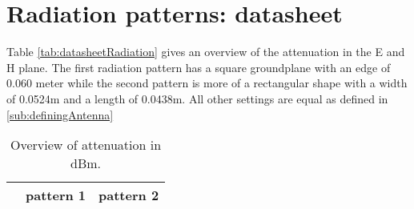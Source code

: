 \chapter{Radiation patterns: datasheet}
\label{ch:radpattern}
Table \ref{tab:datasheetRadiation} gives an overview of the attenuation in the E and H plane. The first radiation pattern 
 has a square groundplane with an edge of 0.060 meter while the second pattern is more of a rectangular shape with a width of 0.0524m and a length of 0.0438m.
All other settings are equal as defined in \ref{sub:definingAntenna}
\begin{table*}[!ht]
\centering
\caption{Overview of attenuation in dBm.}
\begin{tabular}{|l|l|l|l|l|}
\hline
 & \multicolumn{2}{c|}{pattern 1} & \multicolumn{2}{|c|}{pattern 2}\\\hline


\end{tabular}
\end{table*}
